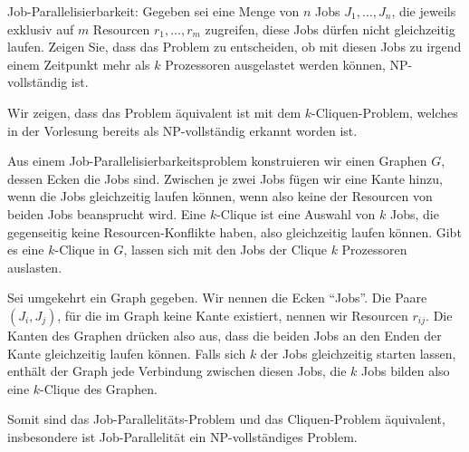 Job-Parallelisierbarkeit:
Gegeben sei eine Menge von $n$ Jobs $J_1,\dots,J_n$, die jeweils exklusiv
auf $m$ Resourcen $r_1,\dots,r_m$ zugreifen, diese Jobs dürfen
nicht gleichzeitig laufen. Zeigen Sie, dass das Problem zu entscheiden,
ob mit diesen Jobs zu irgend einem Zeitpunkt mehr als $k$ Prozessoren
ausgelastet werden können, NP-vollständig ist.


\begin{loesung}
Wir zeigen, dass das Problem äquivalent ist mit dem $k$-Cliquen-Problem,
welches in der Vorlesung bereits als NP-vollständig erkannt worden ist.

Aus einem Job-Parallelisierbarkeitsproblem konstruieren wir einen Graphen $G$,
dessen Ecken die Jobs sind. Zwischen je zwei Jobs fügen wir eine
Kante hinzu, wenn die Jobs gleichzeitig laufen können, wenn also
keine der Resourcen von beiden Jobs beansprucht wird. Eine $k$-Clique
ist eine Auswahl von $k$ Jobs, die gegenseitig keine Resourcen-Konflikte
haben, also gleichzeitig laufen können. Gibt es eine $k$-Clique in $G$,
lassen sich mit den Jobs der Clique $k$ Prozessoren auslasten.

Sei umgekehrt ein Graph gegeben. Wir nennen die Ecken ``Jobs''. Die
Paare $(J_i,J_j)$, für die im Graph keine Kante existiert,  nennen
wir Resourcen $r_{ij}$. Die Kanten des Graphen drücken also aus, dass
die beiden Jobs an den Enden der Kante gleichzeitig laufen können.
Falls sich $k$ der Jobs gleichzeitig starten lassen, enthält der
Graph jede Verbindung zwischen diesen Jobs, die $k$ Jobs bilden also
eine $k$-Clique des Graphen.

Somit sind das Job-Parallelitäts-Problem und das Cliquen-Problem
äquivalent, insbesondere ist Job-Parallelität ein NP-vollständiges
Problem.
\end{loesung}
